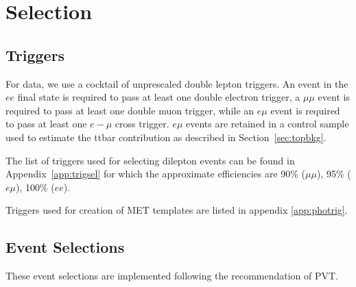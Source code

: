 
\section{Selection}
\label{sec:eventSelection}

\subsection{Triggers}
\label{sec:trigSel}

For data, we use a cocktail of unprescaled %
double lepton triggers. An event
in the $ee$ final state is required to pass at least one %
double electron trigger, a
$\mu\mu$ event is required to pass at least one %
double muon trigger, while an $e\mu$ event is required to pass at least one 
$e-\mu$ cross trigger. 
$e\mu$ events are retained in a control sample used to estimate the 
ttbar contribution as described in Section~\ref{sec:topbkg}.

The list of triggers used for selecting dilepton events can be found in Appendix~\ref{app:trigsel}
for which the approximate efficiencies are 90\% ($\mu\mu$), 95\% ($e\mu$), 100\% ($ee$).

Triggers used for creation of MET templates are listed in appendix \ref{app:photrig}.


\subsection{Event Selections}
\label{sec:evtsel}

These event selections are implemented following the recommendation of PVT.

